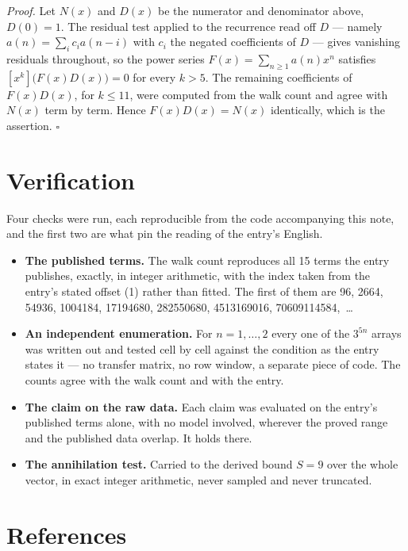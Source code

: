 \documentclass[11pt]{article}
\theoremstyle{definition}
\begin{document}
{\itshape Proof.} Let $N(x)$ and $D(x)$ be the numerator and denominator above, $D(0)=1$. The residual test applied to the recurrence read off $D$ --- namely $a(n) = \sum_i c_i a(n-i)$ with $c_i$ the negated coefficients of $D$ --- gives vanishing residuals throughout, so the power series $F(x)=\sum_{n\ge 1}a(n)x^n$ satisfies $[x^k]\bigl(F(x)D(x)\bigr) = 0$ for every $k > 5$. The remaining coefficients of $F(x)D(x)$, for $k \le 11$, were computed from the walk count and agree with $N(x)$ term by term. Hence $F(x)D(x) = N(x)$ identically, which is the assertion. $\square$

\section{Verification}

Four checks were run, each reproducible from the code accompanying this note, and the first two are what pin the reading of the entry's English.

\begin{itemize}

\item {\bfseries The published terms.} The walk count reproduces all 15 terms the entry publishes, exactly, in integer arithmetic, with the index taken from the entry's stated offset (1) rather than fitted. The first of them are 96, 2664, 54936, 1004184, 17194680, 282550680, 4513169016, 70609114584,~\dots

\item {\bfseries An independent enumeration.} For $n = 1,\dots,2$ every one of the $3^{5n}$ arrays was written out and tested cell by cell against the condition as the entry states it --- no transfer matrix, no row window, a separate piece of code. The counts agree with the walk count and with the entry.

\item {\bfseries The claim on the raw data.} Each claim was evaluated on the entry's published terms alone, with no model involved, wherever the proved range and the published data overlap. It holds there.

\item {\bfseries The annihilation test.} Carried to the derived bound $S = 9$ over the whole vector, in exact integer arithmetic, never sampled and never truncated.

\end{itemize}

\section{References}
\end{document}
